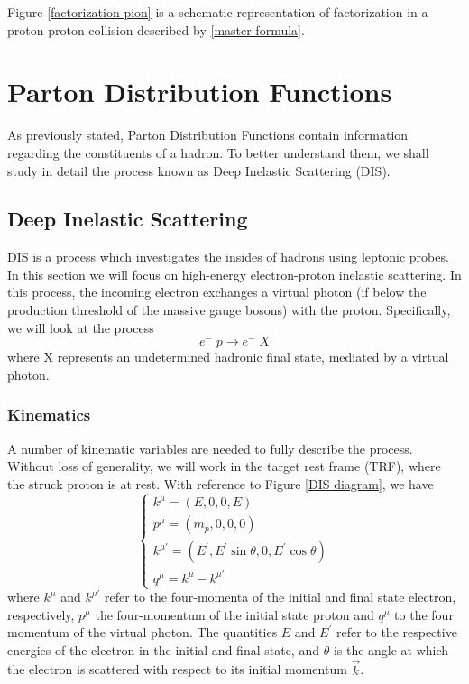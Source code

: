 \documentclass[10pt,a4paper]{book}
\begin{document}
Figure \ref{factorization pion} is a schematic representation of factorization in a proton-proton collision described by \ref{master formula}.

\section{Parton Distribution Functions}

As previously stated, Parton Distribution Functions contain information regarding the constituents of a hadron. To better understand them, we shall study in detail the process known as Deep Inelastic Scattering (DIS).

\subsection{Deep Inelastic Scattering}

DIS is a process which investigates the insides of hadrons using leptonic probes. In this section we will focus on high-energy electron-proton inelastic scattering. In this process, the incoming electron exchanges a virtual photon (if below the production threshold of the massive gauge bosons) with the proton. Specifically, we will look at the process
\begin{equation}
e^- \; p \rightarrow e^- \; X
\end{equation}
where X represents an undetermined hadronic final state, mediated by a virtual photon. 

\subsubsection{Kinematics} 
A number of kinematic variables are needed to fully describe the process. Without loss of generality, we will work in the target rest frame (TRF), where the struck proton is at rest. With reference to Figure \ref{DIS diagram}, we have
\begin{equation}
\begin{cases}
k^\mu = (E, 0, 0, E)  \\
p^\mu = (m_p, 0, 0, 0) \\
k^{\mu\prime} = (E^\prime, E^\prime \sin\theta, 0, E^\prime \cos\theta) \\
q^\mu = k^\mu - k^{\mu\prime}
\end{cases}
\label{kinematics}
\end{equation}
where $k^\mu$ and $k^{\mu\prime}$ refer to the four-momenta of the initial and final state electron, respectively, $p^\mu$ the four-momentum of the initial state proton and $q^\mu$ to the four momentum of the virtual photon. The quantities $E$ and $E^\prime$ refer to the respective energies of the electron in the initial and final state, and $\theta$ is the angle at which the electron is scattered with respect to its initial momentum $\vec{k}$. 
\end{document}
